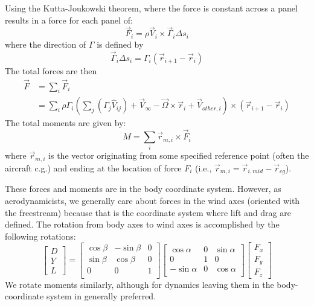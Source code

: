 \documentclass{article}
\begin{document}
Using the Kutta-Joukowski theorem, where the force is constant across a panel results in a force for each panel of:
\begin{equation}
\vec F_i = \rho \vec V_i \times \vec \Gamma_i \Delta s_i
\end{equation}
where the direction of $\Gamma$ is defined by
\begin{equation}
\vec \Gamma_i \Delta s_i = \Gamma_i (\vec{r}_{i+1} - \vec{r}_{i})
\end{equation}
The total forces are then
\begin{align}
\vec{F} &= \sum_i \vec{F}_i\\
&= \sum_i \rho \Gamma_i \left(\sum_j (\Gamma_j \hat{V}_{ij} ) + \vec{V}_\infty - \vec{\Omega} \times \vec{r}_i + \vec{V}_{other, i}\right)\times  (\vec{r}_{i+1} - \vec{r}_{i})
\end{align}
The total moments are given by:
\begin{equation}
M = \sum_i \vec r_{m, i} \times \vec{F}_i
\end{equation}
where $\vec r_{m, i}$ is the vector originating from some specified reference point (often the aircraft c.g.) and ending at the location of force $F_i$ (i.e., $\vec r_{m, i} = \vec r_{i, mid} - \vec r_{cg}$).

These forces and moments are in the body coordinate system.  However, as aerodynamicists, we generally care about forces in the wind axes (oriented with the freestream) because that is the coordinate system where lift and drag are defined.  The rotation from body axes to wind axes is accomplished by the following rotations:
\begin{equation}
\begin{bmatrix}
D\\
Y\\
L
\end{bmatrix}
= 
\begin{bmatrix}
\cos\beta & -\sin\beta & 0 \\
\sin\beta & \cos\beta & 0 \\
0 & 0 & 1\\
\end{bmatrix}
\begin{bmatrix}
\cos\alpha & 0 & \sin\alpha \\
0 & 1 & 0\\
-\sin\alpha & 0 & \cos\alpha \\
\end{bmatrix}
\begin{bmatrix}
F_x\\
F_y\\
F_z
\end{bmatrix}
\end{equation}
We rotate moments similarly, although for dynamics leaving them in the body-coordinate system in generally preferred.
\end{document}
